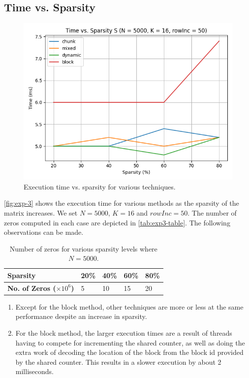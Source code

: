 \documentclass[conference,compsoc]{IEEEtran}
\begin{document}
\subsection{Time vs. Sparsity}
\label{subsec:exp3}

\begin{figure}[!ht]
    \includegraphics[width=\columnwidth]{images/exp3.png}
    \caption{Execution time vs. sparsity for various techniques.}
    \label{fig:exp-3}
\end{figure}

\autoref{fig:exp-3} shows the execution time for various methods as the sparsity
of the matrix increases. We set \(N = 5000\), \(K = 16\) and \(rowInc = 50\).
The number of zeros computed in each case are depicted in
\autoref{tab:exp3-table}. The following observations can be made.

\begin{table}[!ht]
    \begin{tabularx}{\columnwidth}{|Y|Y|Y|Y|Y|}
        \hline
        \textbf{Sparsity} & 20\% & 40\% & 60\% & 80\% \\
        \hline
        \textbf{No. of Zeros (\(\times 10^6\))} & 5 & 10 & 15 & 20 \\
        \hline
    \end{tabularx}
    \caption{Number of zeros for various sparsity levels where \(N = 5000\).}
    \label{tab:exp3-table}
\end{table}

\begin{enumerate}
    \item Except for the block method, other techniques are more or less at the
    same performance despite an increase in sparsity.
    \item For the block method, the larger execution times are a result of
    threads having to compete for incrementing the shared counter, as well as
    doing the extra work of decoding the location of the block from the block id
    provided by the shared counter. This results in a slower execution by about
    2 milliseconds.
\end{enumerate}
\end{document}

